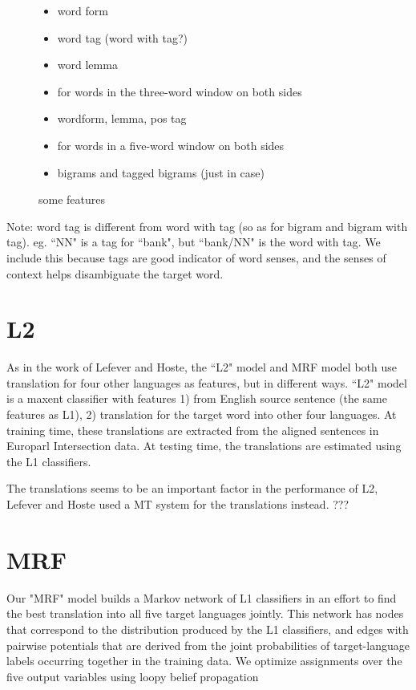 \documentclass[11pt,letterpaper]{article}
\begin{document}
\begin{figure}
  \begin{itemize}
  \item word form
  \item word tag (word with tag?)
  \item word lemma
  \item for words in the three-word window on both sides
  \item wordform, lemma, pos tag
  \item for words in a five-word window on both sides
  \item bigrams and tagged bigrams (just in case)
  \end{itemize}
  \label{features}
  \caption{some features}
\end{figure}

Note: word tag is different from word with tag (so as for bigram and bigram
with tag). eg. ``NN" is a tag for ``bank", but ``bank/NN" is the word with tag.
We include this because tags are good indicator of word senses, and the senses
of context helps disambiguate the target word. 

\section{L2}
As in the work of Lefever and Hoste, the ``L2" model and MRF model both use
translation for four other languages as features, but in different ways.  ``L2"
model is a maxent classifier with features 1) from English source sentence (the
same features as L1), 2) translation for the target word into other four
languages.  At training time, these translations are extracted from the aligned
sentences in Europarl Intersection data.  At testing time, the translations are
estimated using the L1 classifiers. 

The translations seems to be an important factor in the performance of L2,
Lefever and Hoste used a MT system for the translations instead.
???



\section{MRF}
Our "MRF" model builds a Markov network of L1 classifiers in an effort to find
the best translation into all five target languages jointly. This network has
nodes that correspond to the distribution produced by the L1 classifiers, and
edges with pairwise potentials that are derived from the joint probabilities of
target-language labels occurring together in the training data. We optimize
assignments over the five output variables using loopy belief propagation
\end{document}
